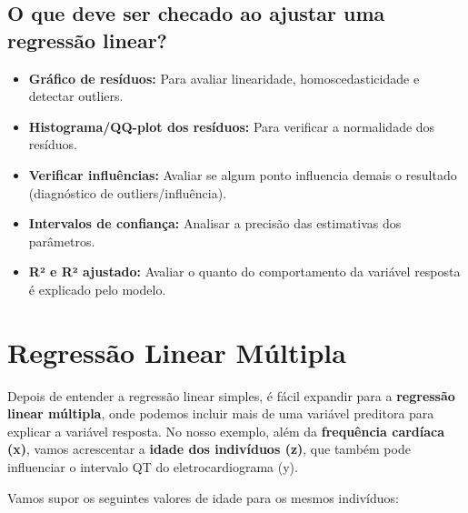 \documentclass[
]{book}
\providecommand{\tightlist}{%
  \setlength{\itemsep}{0pt}\setlength{\parskip}{0pt}}
\begin{document}
\subsection{O que deve ser checado ao ajustar uma regressão linear?}\label{o-que-deve-ser-checado-ao-ajustar-uma-regressuxe3o-linear}

\begin{itemize}
\tightlist
\item
  \textbf{Gráfico de resíduos:} Para avaliar linearidade, homoscedasticidade e detectar outliers.
\item
  \textbf{Histograma/QQ-plot dos resíduos:} Para verificar a normalidade dos resíduos.
\item
  \textbf{Verificar influências:} Avaliar se algum ponto influencia demais o resultado (diagnóstico de outliers/influência).
\item
  \textbf{Intervalos de confiança:} Analisar a precisão das estimativas dos parâmetros.
\item
  \textbf{R² e R² ajustado:} Avaliar o quanto do comportamento da variável resposta é explicado pelo modelo.
\end{itemize}

\section{Regressão Linear Múltipla}\label{regressuxe3o-linear-muxfaltipla}

Depois de entender a regressão linear simples, é fácil expandir para a \textbf{regressão linear múltipla}, onde podemos incluir mais de uma variável preditora para explicar a variável resposta. No nosso exemplo, além da \textbf{frequência cardíaca (x)}, vamos acrescentar a \textbf{idade dos indivíduos (z)}, que também pode influenciar o intervalo QT do eletrocardiograma (y).

Vamos supor os seguintes valores de idade para os mesmos indivíduos:
\end{document}
